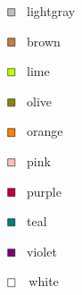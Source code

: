 \documentclass[a4paper, twoside, 8pt]{extarticle}
\begin{document}
\begin{multicols*}{2}
\begin{multicols*}{3}
$\begin{tikzpicture}[scale=0.5, baseline=-0.65ex]
\filldraw[fill=lightgray, draw=black] (-6pt, -6pt) rectangle (6pt, 6pt);
\end{tikzpicture}$ \, lightgray

$\begin{tikzpicture}[scale=0.5, baseline=-0.65ex]
\filldraw[fill=brown, draw=black] (-6pt, -6pt) rectangle (6pt, 6pt);
\end{tikzpicture}$ \, brown

$\begin{tikzpicture}[scale=0.5, baseline=-0.65ex]
\filldraw[fill=lime, draw=black] (-6pt, -6pt) rectangle (6pt, 6pt);
\end{tikzpicture}$ \, lime

$\begin{tikzpicture}[scale=0.5, baseline=-0.65ex]
\filldraw[fill=olive, draw=black] (-6pt, -6pt) rectangle (6pt, 6pt);
\end{tikzpicture}$ \, olive

$\begin{tikzpicture}[scale=0.5, baseline=-0.65ex]
\filldraw[fill=orange, draw=black] (-6pt, -6pt) rectangle (6pt, 6pt);
\end{tikzpicture}$ \, orange

$\begin{tikzpicture}[scale=0.5, baseline=-0.65ex]
\filldraw[fill=pink, draw=black] (-6pt, -6pt) rectangle (6pt, 6pt);
\end{tikzpicture}$ \, pink

$\begin{tikzpicture}[scale=0.5, baseline=-0.65ex]
\filldraw[fill=purple, draw=black] (-6pt, -6pt) rectangle (6pt, 6pt);
\end{tikzpicture}$ \, purple

$\begin{tikzpicture}[scale=0.5, baseline=-0.65ex]
\filldraw[fill=teal, draw=black] (-6pt, -6pt) rectangle (6pt, 6pt);
\end{tikzpicture}$ \, teal

$\begin{tikzpicture}[scale=0.5, baseline=-0.65ex]
\filldraw[fill=violet, draw=black] (-6pt, -6pt) rectangle (6pt, 6pt);
\end{tikzpicture}$ \, violet

$\begin{tikzpicture}[scale=0.5, baseline=-0.65ex]
\filldraw[fill=white, draw=black] (-6pt, -6pt) rectangle (6pt, 6pt);
\end{tikzpicture}$~\, white
\end{multicols*}
\end{multicols*}
\end{document}
